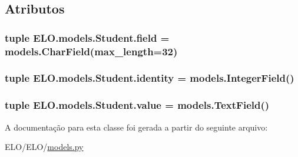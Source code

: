 \subsection{Atributos}
\hypertarget{classELO_1_1models_1_1Student_a893ec9b2ece5c6b829fce5e5a7c1d576}{
\subsubsection[{field}]{\setlength{\rightskip}{0pt plus 5cm}tuple E\-L\-O.\-models.\-Student.\-field = models.\-Char\-Field(max\-\_\-length=32)\hspace{0.3cm}{\ttfamily [static]}}}\label{classELO_1_1models_1_1Student_a893ec9b2ece5c6b829fce5e5a7c1d576}
\hypertarget{classELO_1_1models_1_1Student_a20a7789a2b0f5b7d0c98453dcf38bc4e}{
\subsubsection[{identity}]{\setlength{\rightskip}{0pt plus 5cm}tuple E\-L\-O.\-models.\-Student.\-identity = models.\-Integer\-Field()\hspace{0.3cm}{\ttfamily [static]}}}\label{classELO_1_1models_1_1Student_a20a7789a2b0f5b7d0c98453dcf38bc4e}
\hypertarget{classELO_1_1models_1_1Student_a201226779dce6e064cb16bd92ed016e2}{
\subsubsection[{value}]{\setlength{\rightskip}{0pt plus 5cm}tuple E\-L\-O.\-models.\-Student.\-value = models.\-Text\-Field()\hspace{0.3cm}{\ttfamily [static]}}}\label{classELO_1_1models_1_1Student_a201226779dce6e064cb16bd92ed016e2}


A documentação para esta classe foi gerada a partir do seguinte arquivo\-:\begin{DoxyCompactItemize}
\item 
E\-L\-O/\-E\-L\-O/\hyperlink{ELO_2models_8py}{models.\-py}\end{DoxyCompactItemize}
